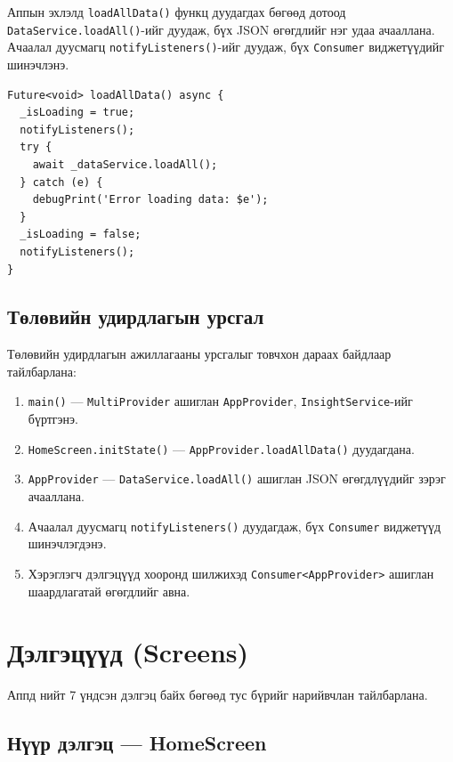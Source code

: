 Аппын эхлэлд \texttt{loadAllData()} функц дуудагдах бөгөөд дотоод \texttt{DataService.loadAll()}-ийг дуудаж, бүх JSON өгөгдлийг нэг удаа ачааллана. Ачаалал дуусмагц \texttt{notifyListeners()}-ийг дуудаж, бүх \texttt{Consumer} виджетүүдийг шинэчлэнэ.

\begin{verbatim}
Future<void> loadAllData() async {
  _isLoading = true;
  notifyListeners();
  try {
    await _dataService.loadAll();
  } catch (e) {
    debugPrint('Error loading data: $e');
  }
  _isLoading = false;
  notifyListeners();
}
\end{verbatim}

\subsection{Төлөвийн удирдлагын урсгал}

Төлөвийн удирдлагын ажиллагааны урсгалыг товчхон дараах байдлаар тайлбарлана:

\begin{enumerate}
	\item \texttt{main()} — \texttt{MultiProvider} ашиглан \texttt{AppProvider}, \texttt{InsightService}-ийг бүртгэнэ.
	\item \texttt{HomeScreen.initState()} — \texttt{AppProvider.loadAllData()} дуудагдана.
	\item \texttt{AppProvider} — \texttt{DataService.loadAll()} ашиглан JSON өгөгдлүүдийг зэрэг ачааллана.
	\item Ачаалал дуусмагц \texttt{notifyListeners()} дуудагдаж, бүх \texttt{Consumer} виджетүүд шинэчлэгдэнэ.
	\item Хэрэглэгч дэлгэцүүд хооронд шилжихэд \texttt{Consumer<AppProvider>} ашиглан шаардлагатай өгөгдлийг авна.
\end{enumerate}

\section{Дэлгэцүүд (Screens)}

Аппд нийт 7 үндсэн дэлгэц байх бөгөөд тус бүрийг нарийвчлан тайлбарлана.

\subsection{Нүүр дэлгэц — HomeScreen}

